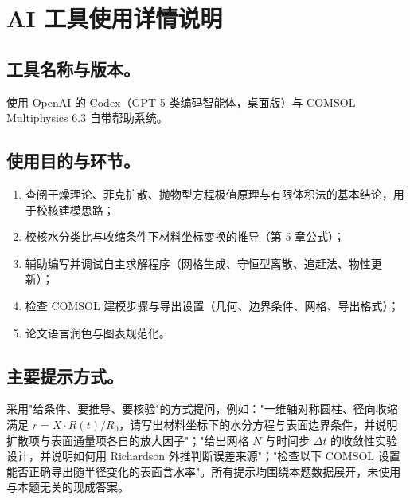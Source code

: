 \documentclass[12pt,a4paper]{article}
\begin{document}
\section{AI 工具使用详情说明}

\subsection*{工具名称与版本。} 使用 OpenAI 的 Codex（GPT-5 类编码智能体，桌面版）与 COMSOL Multiphysics 6.3 自带帮助系统。

\subsection*{使用目的与环节。} 
\begin{enumerate}
       \item 查阅干燥理论、菲克扩散、抛物型方程极值原理与有限体积法的基本结论，用于校核建模思路；
       \item 校核水分类比与收缩条件下材料坐标变换的推导（第 5 章公式）；
       \item 辅助编写并调试自主求解程序（网格生成、守恒型离散、追赶法、物性更新）；
       \item 检查 COMSOL 建模步骤与导出设置（几何、边界条件、网格、导出格式）；
       \item 论文语言润色与图表规范化。
\end{enumerate}

\subsection*{主要提示方式。} 采用"给条件、要推导、要核验"的方式提问，例如："一维轴对称圆柱、径向收缩满足 $r=X\cdot R(t)/R_0$，请写出材料坐标下的水分方程与表面边界条件，并说明扩散项与表面通量项各自的放大因子"；"给出网格 $N$ 与时间步 $\Delta t$ 的收敛性实验设计，并说明如何用 Richardson 外推判断误差来源"；"检查以下 COMSOL 设置能否正确导出随半径变化的表面含水率"。所有提示均围绕本题数据展开，未使用与本题无关的现成答案。
\end{document}
